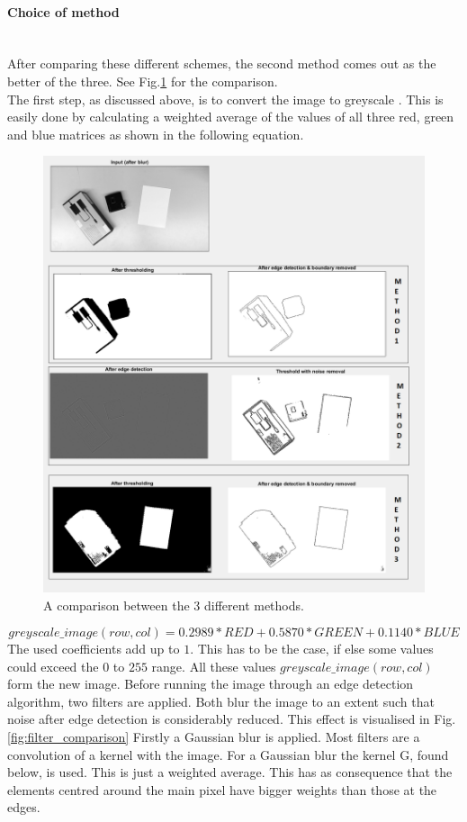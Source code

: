 \documentclass[11pt]{article}
\begin{document}
\paragraph{Choice of method}\mbox{}\\
After comparing these different schemes, the second method comes out as the better of the three. See Fig.\ref{fig:comparison_methods} for the comparison.\\
The first step, as discussed above, is to convert the image to greyscale \cite{greyscale}. This is easily done by calculating a weighted average of the values of all three red, green and blue matrices as shown in the following equation.
\begin{figure}[h]
\center
\includegraphics[width=0.7\linewidth]{comparison_methods.png}
\caption{A comparison between the 3 different methods.}
\label{fig:comparison_methods}
\end{figure}
\begin{equation}
greyscale\_image(row, col) = 0.2989 * RED + 0.5870 * GREEN + 0.1140 * BLUE
\end{equation}
The used coefficients add up to $1$. This has to be the case, if else some values could exceed the $0$ to $255$ range. All these values $greyscale\_image(row, col)$ form the new image.
\noindent Before running the image through an edge detection algorithm, two filters are applied. Both blur the image to an extent such that noise after edge detection is considerably reduced. This effect is visualised in Fig. \ref{fig:filter_comparison}
Firstly a Gaussian blur\cite{gaussian} is applied. Most filters are a convolution of a kernel with the image. For a Gaussian blur the kernel G, found below, is used. This is just a weighted average. This has as consequence that the elements centred around the main pixel have bigger weights than those at the edges.
\end{document}
